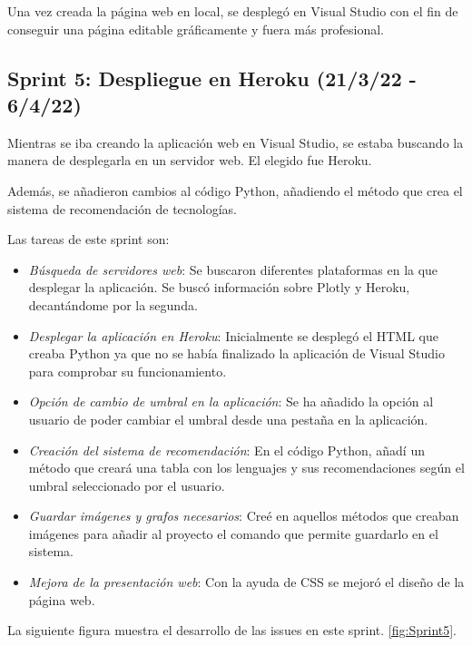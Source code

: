 Una vez creada la página web en local, se desplegó en Visual Studio con el fin de conseguir una página editable gráficamente y fuera más profesional.

\subsection{Sprint 5: Despliegue en Heroku (21/3/22 - 6/4/22)}
Mientras se iba creando la aplicación web en Visual Studio, se estaba buscando la manera de desplegarla en un servidor web. El elegido fue Heroku.

Además, se añadieron cambios al código Python, añadiendo el método que crea el sistema de recomendación de tecnologías.

Las tareas de este sprint son:
\begin{itemize}
    \item \textit{Búsqueda de servidores web}: Se buscaron diferentes plataformas en la que desplegar la aplicación. Se buscó información sobre Plotly y Heroku, decantándome por la segunda. 
    
    \item \textit{Desplegar la aplicación en Heroku}: Inicialmente se desplegó el HTML que creaba Python ya que no se había finalizado la aplicación de Visual Studio para comprobar su funcionamiento.
    
    \item \textit{Opción de cambio de umbral en la aplicación}: Se ha añadido la opción al usuario de poder cambiar el umbral desde una pestaña en la aplicación.
    
    \item \textit{Creación del sistema de recomendación}: En el código Python, añadí un método que creará una tabla con los lenguajes y sus recomendaciones según el umbral seleccionado por el usuario.
    
    \item \textit{Guardar imágenes y grafos necesarios}: Creé en aquellos métodos que creaban imágenes para añadir al proyecto el comando que permite guardarlo en el sistema.
    
    \item \textit{Mejora de la presentación web}: Con la ayuda de CSS se mejoró el diseño de la página web.
\end{itemize}

La siguiente figura muestra el desarrollo de las issues en este sprint. \ref{fig:Sprint5}.



